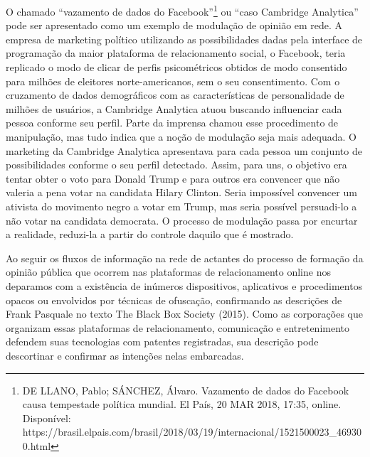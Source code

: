 O chamado ``vazamento de dados do Facebook''\footnote{DE LLANO, Pablo;
  SÁNCHEZ, Álvaro. Vazamento de dados do Facebook causa tempestade
  política mundial. El País, 20 MAR 2018, 17:35, online. Disponível:
  https://brasil.elpais.com/brasil/2018/03/19/internacional/1521500023\_469300.html}
ou ``caso Cambridge Analytica'' pode ser apresentado como um exemplo de
modulação de opinião em rede. A empresa de marketing político utilizando
as possibilidades dadas pela interface de programação da maior
plataforma de relacionamento social, o Facebook, teria replicado o modo
de clicar de perfis psicométricos obtidos de modo consentido para
milhões de eleitores norte-americanos, sem o seu consentimento. Com o
cruzamento de dados demográficos com as características de personalidade
de milhões de usuários, a Cambridge Analytica atuou buscando influenciar
cada pessoa conforme seu perfil. Parte da imprensa chamou esse
procedimento de manipulação, mas tudo indica que a noção de modulação
seja mais adequada. O marketing da Cambridge Analytica apresentava para
cada pessoa um conjunto de possibilidades conforme o seu perfil
detectado. Assim, para uns, o objetivo era tentar obter o voto para
Donald Trump e para outros era convencer que não valeria a pena votar na
candidata Hilary Clinton. Seria impossível convencer um ativista do
movimento negro a votar em Trump, mas seria possível persuadi-lo a não
votar na candidata democrata. O processo de modulação passa por encurtar
a realidade, reduzi-la a partir do controle daquilo que é mostrado.

Ao seguir os fluxos de informação na rede de actantes do processo de
formação da opinião pública que ocorrem nas plataformas de
relacionamento online nos deparamos com a existência de inúmeros
dispositivos, aplicativos e procedimentos opacos ou envolvidos por
técnicas de ofuscação, confirmando as descrições de Frank Pasquale no
texto The Black Box Society (2015). Como as corporações que organizam
essas plataformas de relacionamento, comunicação e entretenimento
defendem suas tecnologias com patentes registradas, sua descrição pode
descortinar e confirmar as intenções nelas embarcadas.

